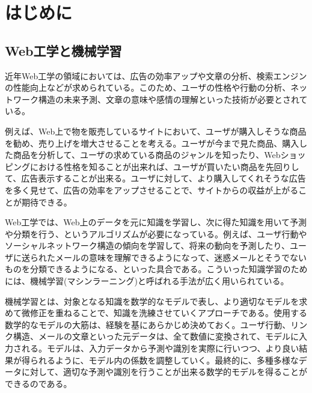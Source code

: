 \chapter{はじめに}
\label{chap:preface}
\section{Web工学と機械学習}
近年Web工学の領域においては、広告の効率アップや文章の分析、検索エンジンの性能向上などが求められている。このため、ユーザの性格や行動の分析、ネットワーク構造の未来予測、文章の意味や感情の理解といった技術が必要とされている。\par
例えば、Web上で物を販売しているサイトにおいて、ユーザが購入しそうな商品を勧め、売り上げを増大させることを考える。ユーザが今まで見た商品、購入した商品を分析して、ユーザの求めている商品のジャンルを知ったり、Webショッピングにおける性格を知ることが出来れば、ユーザが買いたい商品を先回りして、広告表示することが出来る。ユーザに対して、より購入してくれそうな広告を多く見せて、広告の効率をアップさせることで、サイトからの収益が上がることが期待できる。\par
Web工学では、Web上のデータを元に知識を学習し、次に得た知識を用いて予測や分類を行う、というアルゴリズムが必要になっている。例えば、ユーザ行動やソーシャルネットワーク構造の傾向を学習して、将来の動向を予測したり、ユーザに送られたメールの意味を理解できるようになって、迷惑メールとそうでないものを分類できるようになる、といった具合である。こういった知識学習のためには、機械学習(マシンラーニング)と呼ばれる手法が広く用いられている。\par
機械学習とは、対象となる知識を数学的なモデルで表し、より適切なモデルを求めて微修正を重ねることで、知識を洗練させていくアプローチである。使用する数学的なモデルの大筋は、経験を基にあらかじめ決めておく。ユーザ行動、リンク構造、メールの文章といった元データは、全て数値に変換されて、モデルに入力される。モデルは、入力データから予測や識別を実際に行いつつ、より良い結果が得られるように、モデル内の係数を調整していく。最終的に、多種多様なデータに対して、適切な予測や識別を行うことが出来る数学的モデルを得ることができるのである。

